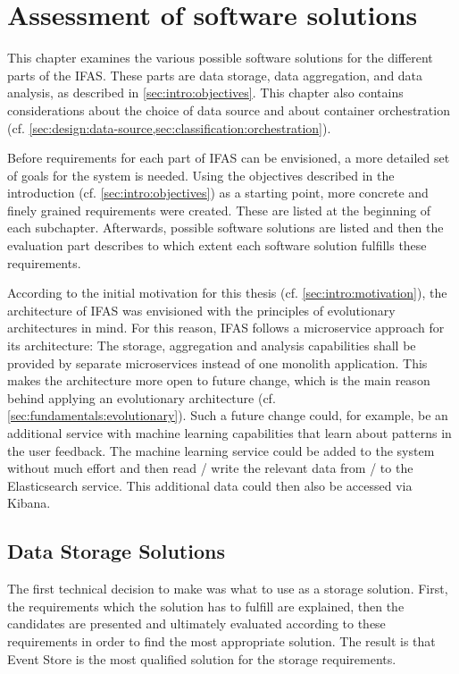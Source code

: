 %
\chapter{Assessment of software solutions}
\label{ch:classifications}

This chapter examines the various possible software solutions for the different parts of the \acf{IFAS}.
These parts are data storage, data aggregation, and data analysis, as described in \cref{sec:intro:objectives}.
This chapter also contains considerations about the choice of data source and about container orchestration (cf. \cref{sec:design:data-source,sec:classification:orchestration}).

Before requirements for each part of \ac{IFAS} can be envisioned, a more detailed set of goals for the system is needed.
Using the objectives described in the introduction (cf. \cref{sec:intro:objectives}) as a starting point, more concrete and finely grained requirements were created.
These are listed at the beginning of each subchapter.
Afterwards, possible software solutions are listed and then the evaluation part describes to which extent each software solution fulfills these requirements.

According to the initial motivation for this thesis (cf. \cref{sec:intro:motivation}), the architecture of \ac{IFAS} was envisioned with the principles of evolutionary architectures in mind.
For this reason, \ac{IFAS} follows a microservice approach for its architecture: The storage, aggregation and analysis capabilities shall be provided by separate microservices instead of one monolith application.
This makes the architecture more open to future change, which is the main reason behind applying an evolutionary architecture (cf. \cref{sec:fundamentals:evolutionary}).
Such a future change could, for example, be an additional service with machine learning capabilities that learn about patterns in the user feedback.
The machine learning service could be added to the system without much effort and then read / write the relevant data from / to the Elasticsearch service.
This additional data could then also be accessed via Kibana.

\section{Data Storage Solutions}
\label{sec:classifications:storage}

The first technical decision to make was what to use as a storage solution.
First, the requirements which the solution has to fulfill are explained, then the candidates are presented and ultimately evaluated according to these requirements in order to find the most appropriate solution.
The result is that Event Store is the most qualified solution for the storage requirements.

